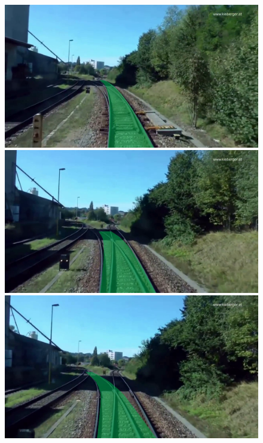 \begin{figure}[H]
    \begin{minipage}{0.16\textwidth}
        \includegraphics[width=\textwidth]{PICs/Baselinepaper/limitation_1.png}
    \end{minipage}
    \hfill
    \begin{minipage}{0.16\textwidth}
        \includegraphics[width=\textwidth]{PICs/Baselinepaper/limitation_2.png}
    \end{minipage}
    \hfill
    \begin{minipage}{0.16\textwidth}
        \includegraphics[width=\textwidth]{PICs/Baselinepaper/limitation_3.png}

\end{minipage}
\end{figure}
